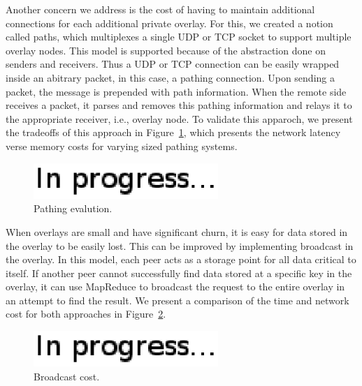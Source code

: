 \documentclass[conference]{IEEEtran}
\begin{document}
Another concern we address is the cost of having to maintain additional
connections for each additional private overlay.  For this, we created a notion
called paths, which multiplexes a single UDP or TCP socket to support multiple
overlay nodes.  This model is supported because of the abstraction done on
senders and receivers.  Thus a UDP or TCP connection can be easily wrapped 
inside an abitrary packet, in this case, a pathing connection.  Upon sending
a packet, the message is prepended with path information.  When the remote side
receives a packet, it parses and removes this pathing information and relays it
to the appropriate receiver, i.e., overlay node.  To validate this apparoch, we
present the tradeoffs of this approach in Figure~\ref{fig:pathing_eval}, which
presents the network latency verse memory costs for varying sized pathing systems.

\begin{figure}[h]
\centering
\includegraphics[width=2.75in]{in_progress.eps}
\caption{Pathing evalution.}
\label{fig:pathing_eval}
\end{figure}

When overlays are small and have significant churn, it is easy for data stored
in the overlay to be easily lost.  This can be improved by implementing
broadcast in the overlay.  In this model, each peer acts as a
storage point for all data critical to itself.  If another peer cannot
successfully find data stored at a specific key in the overlay, it can use
MapReduce to broadcast the request to the entire overlay in an attempt to find
the result.  We present a comparison of the time and network cost for both
approaches in Figure~\ref{fig:broadcast_cost}.

\begin{figure}[h]
\centering
\includegraphics[width=2.75in]{in_progress.eps}
\caption{Broadcast cost.}
\label{fig:broadcast_cost}
\end{figure}
\end{document}
